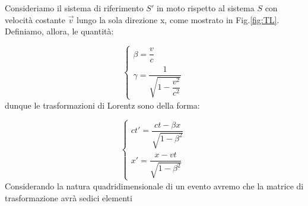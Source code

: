 Consideriamo il sistema di riferimento $S'$ in moto rispetto al sistema $S$ con velocità costante $\Vec{v}$ lungo la sola direzione x, come mostrato in Fig.\ref{fig:TL}. 
\newpage
Definiamo, allora, le quantità:

\begin{equation}
    \begin{cases}
      \beta=\dfrac{v}{c}
             \\
     \gamma = \dfrac{1}{\sqrt{1-\dfrac{v^{2}}{c^{2}}}}
    \end{cases}\,
\end{equation}
dunque le trasformazioni di Lorentz sono della forma:

\begin{equation}
    \begin{cases}
      ct'=\dfrac{ct-\beta x}{\sqrt{1-\beta^2}}
             \\
     x' = \dfrac{x-vt}{\sqrt{1-\beta^2}}
    \end{cases}\,
\end{equation}
Considerando la natura quadridimensionale di un evento avremo che la matrice di trasformazione avrà sedici elementi

